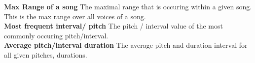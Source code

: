 \noindent \textbf{Max Range of a song} The maximal range that is occuring within a given song. This is the max range over all voices of a song. \\

\noindent \textbf{Most frequent interval/ pitch } The pitch / interval value of the most commonly occuring pitch/interval. \\

\noindent \textbf{Average pitch/interval duration} The average pitch and duration interval for all given pitches, durations. 